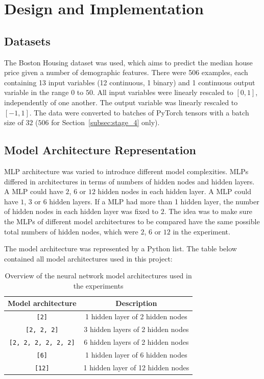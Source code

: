 \section{Design and Implementation}
\label{sec:design}


\subsection{Datasets}
\label{subsec:project_settings_datasets}
The Boston Housing dataset was used, which aims to predict the median house price given a number of demographic features. There were 506 examples, each containing 13 input variables (12 continuous, 1 binary) and 1 continuous output variable in the range $0$ to $50$. All input variables were linearly rescaled to $[0, 1]$, independently of one another. The output variable was linearly rescaled to $[-1, 1]$. The data were converted to batches of PyTorch tensors with a batch size of $32$ ($506$ for Section~\ref{subsec:stage_4} only). 


\subsection{Model Architecture Representation}
MLP architecture was varied to introduce different model complexities. MLPs differed in architectures in terms of numbers of hidden nodes and hidden layers. A MLP could have $2$, $6$ or $12$ hidden nodes in each hidden layer. A MLP could have $1$, $3$ or $6$ hidden layers. If a MLP had more than 1 hidden layer, the number of hidden nodes in each hidden layer was fixed to $2$. The idea was to make sure the MLPs of different model architectures to be compared have the same possible total numbers of hidden nodes, which were $2$, $6$ or $12$ in the experiment. 

The model architecture was represented by a Python list. The table below contained all model architectures used in this project: 

\begin{table}[H]
    \centering
    \begin{tabular}{|c|c|}
        \hline
        Model architecture & Description \\
        \hline
        \small\texttt{[2]} & 1 hidden layer of 2 hidden nodes \\
        \hline
        \small\texttt{[2, 2, 2]} & 3 hidden layers of 2 hidden nodes \\
        \hline
        \small\texttt{[2, 2, 2, 2, 2, 2]} & 6 hidden layers of 2 hidden nodes \\
        \hline
        \small\texttt{[6]} & 1 hidden layer of 6 hidden nodes \\
        \hline
        \small\texttt{[12]} & 1 hidden layer of 12 hidden nodes \\
        \hline
    \end{tabular}
    \caption{Overview of the neural network model architectures used in the experiments}
    \label{table:background_model_architecture}
\end{table}



